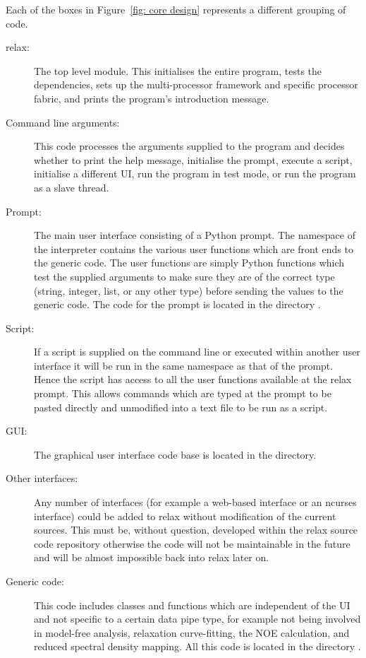 Each of the boxes in Figure~\ref{fig: core design} represents a different grouping of code.
\begin{description}
\item[relax:]  The top level module.  This initialises the entire program, tests the dependencies, sets up the multi-processor framework and specific processor fabric, and prints the program's introduction message.

\item[Command line arguments:]  This code processes the arguments supplied to the program and decides whether to print the help message, initialise the prompt, execute a script, initialise a different UI, run the program in test mode, or run the program as a slave thread.

\item[Prompt:]  The main user interface consisting of a Python prompt.  The namespace of the interpreter contains the various user functions which are front ends to the generic code.  The user functions are simply Python functions which test the supplied arguments to make sure they are of the correct type (string, integer, list, or any other type) before sending the values to the generic code.  The code for the prompt is located in the directory .

\item[Script:]  If a script is supplied on the command line or executed within another user interface it will be run in the same namespace as that of the prompt.  Hence the script has access to all the user functions available at the relax prompt.  This allows commands which are typed at the prompt to be pasted directly and unmodified into a text file to be run as a script.

\item[GUI:]  The graphical user interface code base is located in the  directory.

\item[Other interfaces:]  Any number of interfaces (for example a web-based interface or an ncurses interface) could be added to relax without modification of the current sources.  This must be, without question, developed within the relax source code repository otherwise the code will not be maintainable in the future and will be almost impossible back into relax later on.

\item[Generic code:]  This code includes classes and functions which are independent of the UI and not specific to a certain data pipe type, for example not being involved in model-free analysis, relaxation curve-fitting, the NOE calculation, and reduced spectral density mapping.  All this code is located in the directory .


\end{description}
